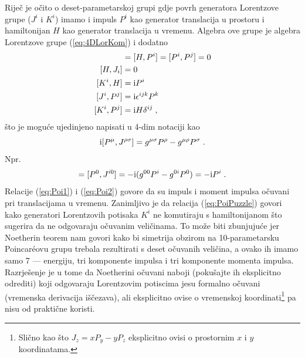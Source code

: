 Riječ je očito o deset-parametarskoj grupi gdje povrh generatora
Lorentzove grupe ($J^i$ i $K^i$) imamo i impuls $P^i$ kao
generator translacija u prostoru i hamiltonijan $H$ kao
generator translacija u vremenu.
Algebra ove grupe je algebra Lorentzove grupe  (\ref{eq:4DLorKom}) 
i dodatno  
\begin{align}
[H, H]& = [H, P^i] = [P^i, P^j] = 0 \label{eq:Poi1} \\
[H, J_i]& = 0  \label{eq:Poi2}\\
[K^i, H]& = \rmi P^i  \label{eq:PoiPuzzle} \\
[J^i, P^j]& = \rmi \epsilon^{ijk} P^k \\
[K^i, P^j]& = \rmi H \delta^{ij} \;,
\label{eq:PoinKom}
\end{align}
što je moguće ujedinjeno napisati u 4-dim notaciji kao
\begin{equation}
\textrm{i} [P^\mu, J^{\rho\sigma}] = g^{\mu\sigma}P^\rho - g^{\mu\rho}P^{\sigma} \;.
\label{eq:4DPoinKom}
\end{equation}
Npr.
\begin{displaymath}
[H, K^i] = [P^0, J^{i0}] = -\rmi(g^{0 0}P^i - g^{0i}P^0) =  -\rmi P^i \;.
\end{displaymath}
Relacije  (\ref{eq:Poi1}) i (\ref{eq:Poi2}) govore da su impuls i
moment impulsa očuvani pri translacijama u vremenu. Zanimljivo je da relacija
(\ref{eq:PoiPuzzle}) govori kako generatori Lorentzovih potisaka
$K^i$ ne komutiraju s hamiltonijanom što sugerira da ne odgovaraju
očuvanim veličinama. To može biti zbunjujuće jer Noetherin teorem
nam govori kako bi simetrija obzirom na 10-parametarsku Poincar\'{e}ovu grupu
trebala rezultirati s deset očuvanih veličina, a ovako ih imamo samo
7 --- energiju, tri komponente impulsa i tri komponente momenta impulsa.
  
Razrješenje je u tome da Noetherini očuvani naboji
(pokušajte ih eksplicitno odrediti) koji
odgovaraju Lorentzovim potiscima jesu formalno očuvani (vremenska
derivacija iščezava), ali eksplicitno ovise o vremenskoj 
koordinati\footnote{Slično kao što $J_z = x P_y - y P_z$ 
eksplicitno ovisi o prostornim $x$ i $y$ koordinatama.}
pa nisu od praktične koristi. 


